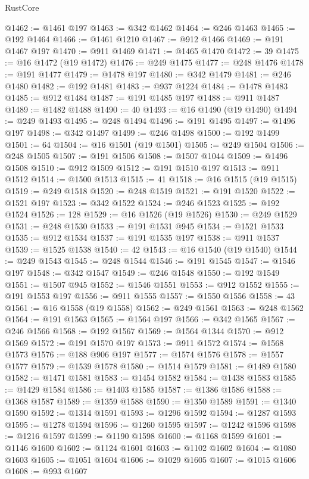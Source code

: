 \begin{lexlean}{RustCore}
\begin{coremodule}
@1462 := @1461 @197
@1463 := @342 @1462
@1464 := @246 @1463
@1465 := @192 @1464
@1466 := @1461 @1210
@1467 := @912 @1466
@1469 := @191 @1467 @197
@1470 := @911 @1469
@1471 := @1465 @1470
@1472 := 39
@1475 := @16 @1472 (@19 @1472)
@1476 := @249 @1475
@1477 := @248 @1476
@1478 := @191 @1477
@1479 := @1478 @197
@1480 := @342 @1479
@1481 := @246 @1480
@1482 := @192 @1481
@1483 := @937 @1224
@1484 := @1478 @1483
@1485 := @912 @1484
@1487 := @191 @1485 @197
@1488 := @911 @1487
@1489 := @1482 @1488
@1490 := 40
@1493 := @16 @1490 (@19 @1490)
@1494 := @249 @1493
@1495 := @248 @1494
@1496 := @191 @1495
@1497 := @1496 @197
@1498 := @342 @1497
@1499 := @246 @1498
@1500 := @192 @1499
@1501 := 64
@1504 := @16 @1501 (@19 @1501)
@1505 := @249 @1504
@1506 := @248 @1505
@1507 := @191 @1506
@1508 := @1507 @1044
@1509 := @1496 @1508
@1510 := @912 @1509
@1512 := @191 @1510 @197
@1513 := @911 @1512
@1514 := @1500 @1513
@1515 := 41
@1518 := @16 @1515 (@19 @1515)
@1519 := @249 @1518
@1520 := @248 @1519
@1521 := @191 @1520
@1522 := @1521 @197
@1523 := @342 @1522
@1524 := @246 @1523
@1525 := @192 @1524
@1526 := 128
@1529 := @16 @1526 (@19 @1526)
@1530 := @249 @1529
@1531 := @248 @1530
@1533 := @191 @1531 @945
@1534 := @1521 @1533
@1535 := @912 @1534
@1537 := @191 @1535 @197
@1538 := @911 @1537
@1539 := @1525 @1538
@1540 := 42
@1543 := @16 @1540 (@19 @1540)
@1544 := @249 @1543
@1545 := @248 @1544
@1546 := @191 @1545
@1547 := @1546 @197
@1548 := @342 @1547
@1549 := @246 @1548
@1550 := @192 @1549
@1551 := @1507 @945
@1552 := @1546 @1551
@1553 := @912 @1552
@1555 := @191 @1553 @197
@1556 := @911 @1555
@1557 := @1550 @1556
@1558 := 43
@1561 := @16 @1558 (@19 @1558)
@1562 := @249 @1561
@1563 := @248 @1562
@1564 := @191 @1563
@1565 := @1564 @197
@1566 := @342 @1565
@1567 := @246 @1566
@1568 := @192 @1567
@1569 := @1564 @1344
@1570 := @912 @1569
@1572 := @191 @1570 @197
@1573 := @911 @1572
@1574 := @1568 @1573
@1576 := @188 @906 @197
@1577 := @1574 @1576
@1578 := @1557 @1577
@1579 := @1539 @1578
@1580 := @1514 @1579
@1581 := @1489 @1580
@1582 := @1471 @1581
@1583 := @1454 @1582
@1584 := @1438 @1583
@1585 := @1429 @1584
@1586 := @1403 @1585
@1587 := @1386 @1586
@1588 := @1368 @1587
@1589 := @1359 @1588
@1590 := @1350 @1589
@1591 := @1340 @1590
@1592 := @1314 @1591
@1593 := @1296 @1592
@1594 := @1287 @1593
@1595 := @1278 @1594
@1596 := @1260 @1595
@1597 := @1242 @1596
@1598 := @1216 @1597
@1599 := @1190 @1598
@1600 := @1168 @1599
@1601 := @1146 @1600
@1602 := @1124 @1601
@1603 := @1102 @1602
@1604 := @1080 @1603
@1605 := @1051 @1604
@1606 := @1029 @1605
@1607 := @1015 @1606
@1608 := @993 @1607

\end{coremodule}
\end{lexlean}

